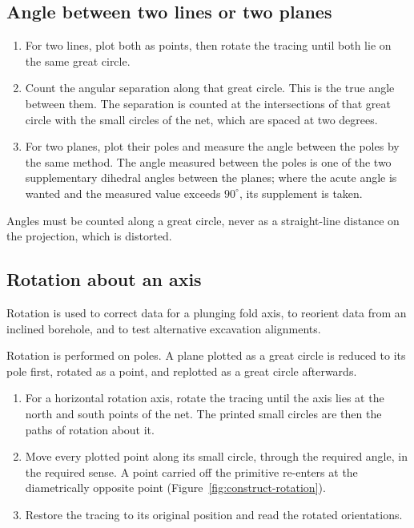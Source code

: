 \subsection{Angle between two lines or two planes}
\label{sec:construct-angles}

\begin{enumerate}
  \item For two lines, plot both as points, then rotate the tracing until
        both lie on the same great circle.
  \item Count the angular separation along that great circle. This is the
        true angle between them. The separation is counted at the
        intersections of that great circle with the small circles of the
        net, which are spaced at two degrees.
  \item For two planes, plot their poles and measure the angle between the
        poles by the same method. The angle measured between the poles is
        one of the two supplementary dihedral angles between the planes;
        where the acute angle is wanted and the measured value exceeds
        $90^\circ$, its supplement is taken.
\end{enumerate}

Angles must be counted along a great circle, never as a straight-line distance
on the projection, which is distorted.

\subsection{Rotation about an axis}
\label{sec:construct-rotation}

Rotation is used to correct data for a plunging fold axis, to reorient data
from an inclined borehole, and to test alternative excavation alignments.

Rotation is performed on poles. A plane plotted as a great circle is reduced
to its pole first, rotated as a point, and replotted as a great circle
afterwards.

\begin{enumerate}
  \item For a horizontal rotation axis, rotate the tracing until the axis
        lies at the north and south points of the net. The printed small
        circles are then the paths of rotation about it.
  \item Move every plotted point along its small circle, through the required
        angle, in the required sense. A point carried off the primitive
        re-enters at the diametrically opposite point
        (Figure~\ref{fig:construct-rotation}).
  \item Restore the tracing to its original position and read the rotated
        orientations.
\end{enumerate}

